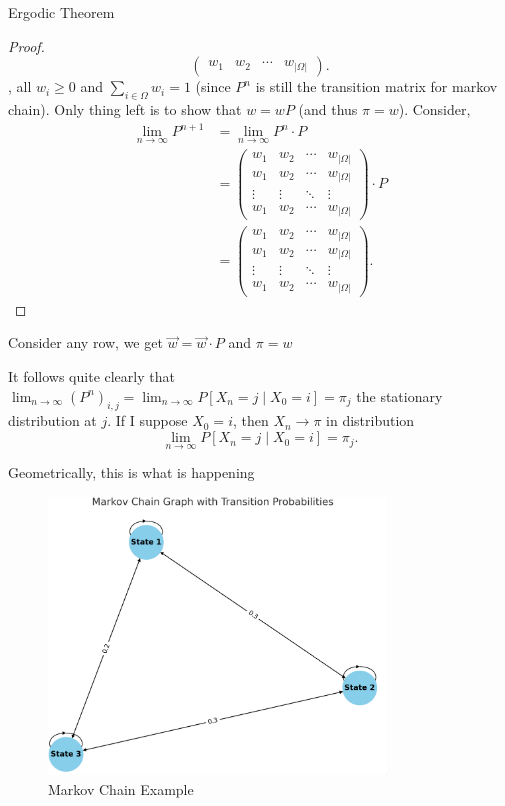 \documentclass[a4paper]{article}
\begin{document}
\begin{theorem}{Ergodic Theorem}
\begin{proof}
\[\begin{pmatrix}
w_1 & w_2 & \cdots & w_{|\Omega|}
\end{pmatrix}
     .\],
     all $w_i \geq 0$ and  $\sum_{i \in \Omega} w_i =1$ (since $P^{n}$ is still the transition matrix for markov chain).
     Only thing left is to show that $w = wP$ (and thus  $\pi = w$). Consider,
     \begin{align*}
       \lim_{n\to \infty} P^{n+1} &= \lim_{n\to \infty} P^{n} \cdot P \\
                                  &= \begin{pmatrix}
w_1 & w_2 & \cdots & w_{|\Omega|} \\
w_1 & w_2 & \cdots & w_{|\Omega|} \\
\vdots & \vdots & \ddots & \vdots \\
w_1 & w_2 & \cdots & w_{|\Omega|}
\end{pmatrix} \cdot P \\
                                  &= \begin{pmatrix}
w_1 & w_2 & \cdots & w_{|\Omega|} \\
w_1 & w_2 & \cdots & w_{|\Omega|} \\
\vdots & \vdots & \ddots & \vdots \\
w_1 & w_2 & \cdots & w_{|\Omega|}
\end{pmatrix} 
     .\end{align*}
  \end{proof}
  Consider any row, we get $\vec{w} = \vec{w} \cdot P$ and $\pi = w$
\end{theorem}

\begin{remark}
  It follows quite clearly that $\lim_{n \to \infty} (P^{n})_{i,j} = \lim_{n \to \infty} P[X_n = j \mid X_0 =i] = \pi_j$ the stationary distribution at $j$. If I suppose  $X_0 = i$, then $X_n \to \pi$ in distribution 
  \[
    \lim_{n \to \infty} P[X_n = j \mid X_0 = i] = \pi_j
  .\] 
\end{remark}

Geometrically, this is what is happening
\begin{figure}[h]
  \centering
  \includegraphics[width=0.8\textwidth]{assets/aperiodic_fs_markov_chain_ex.png}
  \caption{Markov Chain Example}
  \label{fig:aperiodic_fs_markov_chain_ex}
\end{figure}
\end{document}
